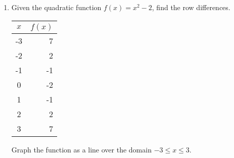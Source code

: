 \documentclass[12pt, twoside]{article}
\begin{document}
\begin{enumerate}
          \item Given the quadratic function $f(x)=x^2-2$, find the row differences.
            \renewcommand{\arraystretch}{1.6}
              \begin{center}
                \begin{tabular}{|c|r|}
                \hline
                $x$ & $f(x)$\\
                \hline
                -3 & 7 \\
                \hline
                -2 & 2 \\
                \hline
                -1 & -1 \\
                \hline
                0 & -2 \\
                \hline
                1 & -1 \\
                \hline
                2 & 2 \\
                \hline
                3 & 7 \\
                \hline
                \end{tabular}
              \end{center}
          Graph the function as a line over the domain $-3 \leq x \leq 3$.

          \begin{center} %
          \end{center}


\end{enumerate}

\newpage
\setcounter{page}{1}
\end{document}
